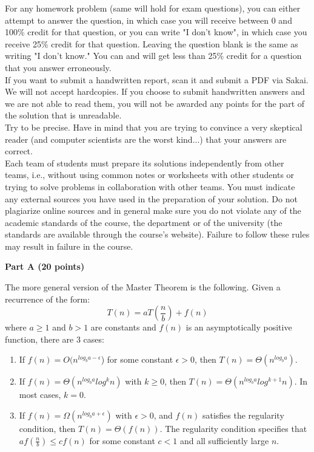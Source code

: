 \documentclass{article}
\begin{document}
 For any homework problem (same will hold
for exam questions), you can either attempt to answer the question, in
which case you will receive between 0 and 100\% credit for that
question, or you can write "I don't know", in which case you receive
25\% credit for that question. Leaving the question blank is the same
as writing "I don't know." You can and will get less than 25\% credit
for a question that you answer erroneously.\\

 If you want to submit a
handwritten report, scan it and submit a PDF via Sakai. We will not
accept hardcopies. If you choose to submit handwritten answers and we
are not able to read them, you will not be awarded any points for the
part of the solution that is unreadable.\\

 Try to be precise. Have in mind that you
are trying to convince a very skeptical reader (and computer
scientists are the worst kind...) that your answers are correct.\\

 Each team of students
must prepare its solutions independently from other teams, i.e.,
without using common notes or worksheets with other students or trying
to solve problems in collaboration with other teams.  You must
indicate any external sources you have used in the preparation of your
solution. Do not plagiarize online sources and in general make sure
you do not violate any of the academic standards of the course, the
department or of the university (the standards are available through
the course's website). Failure to follow these rules may result in
failure in the course.\\

\newpage

\vspace{0.1in}

{\bf }

\begin{center}
{\bf Part A (20 points)}
\end{center}

 The more general version of the Master
Theorem is the following. Given a recurrence of the form: 
$$T(n) = a T(\frac{n}{b}) + f(n)$$
where $a \geq 1$ and $b > 1$ are constants and $f(n)$ is an
asymptotically positive function, there are 3 cases: 
\begin{enumerate}
\item If $f(n) = O(n^{log_ba - \epsilon}$) for some constant $\epsilon
  > 0$, then $T(n) = \Theta(n^{log_ba})$.
\item If $f(n) = \Theta(n^{log_ba} log^kn)$ with $k \geq 0$, then
  $T(n) = \Theta(n^{log_ba} log^{k+1}n)$. In most cases, $k = 0$.
\item If $f(n) = \Omega(n^{log_ba+\epsilon})$ with $\epsilon > 0$, and
  $f(n)$ satisfies the regularity condition, then $T(n) = \Theta( f(n)
  )$. The regularity condition specifies that $a f(\frac{n}{b}) \leq c
  f(n)$ for some constant $c < 1$ and all sufficiently large $n$.
\end{enumerate}
\end{document}
